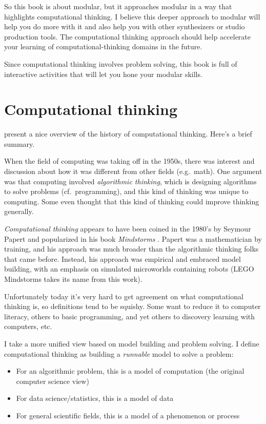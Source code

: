\documentclass[
]{book}
\providecommand{\tightlist}{%
  \setlength{\itemsep}{0pt}\setlength{\parskip}{0pt}}
\begin{document}
So this book is about modular, but it approaches modular in a way that highlights computational thinking.
I believe this deeper approach to modular will help you do more with it and also help you with other synthesizers or studio production tools.
The computational thinking approach should help accelerate your learning of computational-thinking domains in the future.

Since computational thinking involves problem solving, this book is full of interactive activities that will let you hone your modular skills.

\hypertarget{computational-thinking}{%
\section{Computational thinking}\label{computational-thinking}}

\citet{Tedre2016} present a nice overview of the history of computational thinking.
Here's a brief summary.

When the field of computing was taking off in the 1950s, there was interest and discussion about how it was different from other fields (e.g.~math).
One argument was that computing involved \emph{algorithmic thinking}, which is designing algorithms to solve problems (cf.~programming), and this kind of thinking was unique to computing.
Some even thought that this kind of thinking could improve thinking generally.

\emph{Computational thinking} appears to have been coined in the 1980's by Seymour Papert and popularized in his book \emph{Mindstorms} \citep{Papert1980}.
Papert was a mathematician by training, and his approach was much broader than the algorithmic thinking folks that came before.
Instead, his approach was empirical and embraced model building, with an emphasis on simulated microworlds containing robots (LEGO Mindstorms takes its name from this work).

Unfortunately today it's very hard to get agreement on what computational thinking is, so definitions tend to be squishy.
Some want to reduce it to computer literacy, others to basic programming, and yet others to discovery learning with computers, etc.

I take a more unified view based on model building and problem solving.
I define computational thinking as building a \emph{runnable} model to solve a problem:

\begin{itemize}
\tightlist
\item
  For an algorithmic problem, this is a model of computation (the original computer science view)
\item
  For data science/statistics, this is a model of data
\item
  For general scientific fields, this is a model of a phenomenon or process
\end{itemize}
\end{document}
